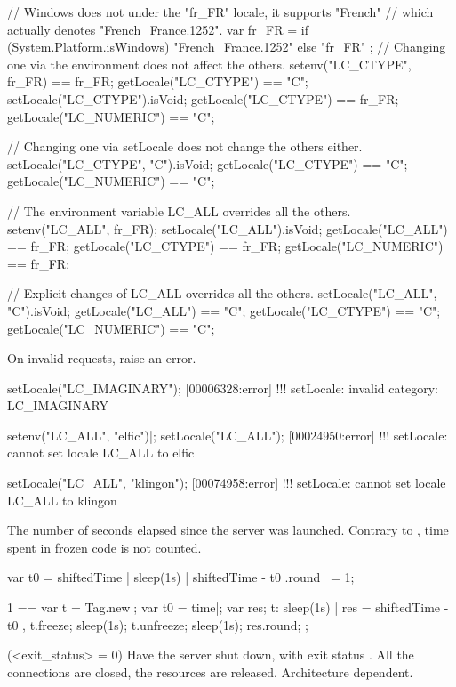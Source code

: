 \begin{urbiscriptapi}
\begin{urbiassert}
// Windows does not under the "fr_FR" locale, it supports "French"
// which actually denotes "French_France.1252".
var fr_FR =
  { if (System.Platform.isWindows) "French_France.1252" else "fr_FR" };
// Changing one via the environment does not affect the others.
setenv("LC_CTYPE", fr_FR) == fr_FR;
getLocale("LC_CTYPE")   == "C";
setLocale("LC_CTYPE").isVoid;
getLocale("LC_CTYPE")   == fr_FR;
getLocale("LC_NUMERIC") == "C";

// Changing one via setLocale does not change the others either.
setLocale("LC_CTYPE", "C").isVoid;
getLocale("LC_CTYPE")   == "C";
getLocale("LC_NUMERIC") == "C";

// The environment variable LC_ALL overrides all the others.
setenv("LC_ALL", fr_FR);
setLocale("LC_ALL").isVoid;
getLocale("LC_ALL")     == fr_FR;
getLocale("LC_CTYPE")   == fr_FR;
getLocale("LC_NUMERIC") == fr_FR;

// Explicit changes of LC_ALL overrides all the others.
setLocale("LC_ALL", "C").isVoid;
getLocale("LC_ALL")     == "C";
getLocale("LC_CTYPE")   == "C";
getLocale("LC_NUMERIC") == "C";
\end{urbiassert}

  On invalid requests, raise an error.
\begin{urbiscript}
setLocale("LC_IMAGINARY");
[00006328:error] !!! setLocale: invalid category: LC_IMAGINARY

setenv("LC_ALL", "elfic")|;
setLocale("LC_ALL");
[00024950:error] !!! setLocale: cannot set locale LC_ALL to elfic

setLocale("LC_ALL", "klingon");
[00074958:error] !!! setLocale: cannot set locale LC_ALL to klingon
\end{urbiscript}


\item[shiftedTime] The number of seconds elapsed since the \urbi server was
  launched.  Contrary to , time spent in frozen code is not
  counted.
\begin{urbiassert}
{ var t0 = shiftedTime | sleep(1s) | shiftedTime - t0 }.round ~= 1;

  1 ==
  {
    var t = Tag.new|;
    var t0 = time|;
    var res;
    t: { sleep(1s) | res = shiftedTime - t0 },
    t.freeze;
    sleep(1s);
    t.unfreeze;
    sleep(1s);
    res.round;
  };
\end{urbiassert}


\item[shutdown](<exit_status> = 0)%
  Have the \urbi server shut down, with exit status .  All
  the connections are closed, the resources are released.  Architecture
  dependent.



\end{urbiscriptapi}
